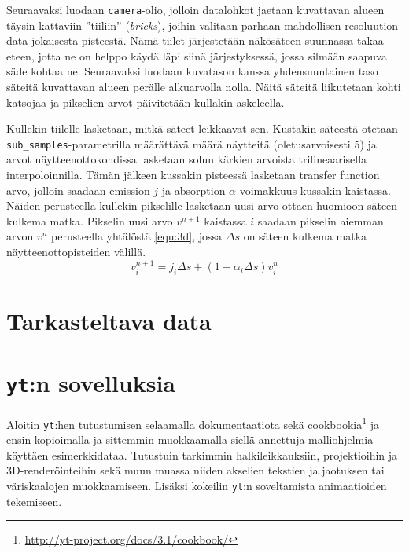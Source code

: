 \documentclass[12pt,a4paper]{article}
\newcommand{\yt}{\texttt{yt}}
\begin{document}
Seuraavaksi luodaan \texttt{camera}-olio, jolloin datalohkot jaetaan kuvattavan alueen täysin kattaviin ''tiiliin'' (\textit{bricks}), joihin valitaan parhaan mahdollisen resoluution data jokaisesta pisteestä. Nämä tiilet järjestetään näkösäteen suunnassa takaa eteen, jotta ne on helppo käydä läpi siinä järjestyksessä, jossa silmään saapuva säde kohtaa ne. Seuraavaksi luodaan kuvatason kanssa yhdensuuntainen taso säteitä kuvattavan alueen perälle alkuarvolla nolla. Näitä säteitä liikutetaan kohti katsojaa ja pikselien arvot päivitetään kullakin askeleella. \cite{volume}

\begin{sloppypar}
Kullekin tiilelle lasketaan, mitkä säteet leikkaavat sen. Kustakin säteestä otetaan \texttt{sub\_samples}-parametrilla määrättävä määrä näytteitä (oletusarvoisesti 5) ja arvot näytteenottokohdissa lasketaan solun kärkien arvoista trilineaarisella interpoloinnilla. Tämän jälkeen kussakin pisteessä lasketaan transfer function arvo, jolloin saadaan emission $j$ ja absorption $\alpha$ voimakkuus kussakin kaistassa. Näiden perusteella kullekin pikselille lasketaan uusi arvo ottaen huomioon säteen kulkema matka. Pikselin uusi arvo $v^{n+1}$ kaistassa $i$ saadaan pikselin aiemman arvon $v^n$ perusteella yhtälöstä \ref{equ:3d}, jossa $\Delta s$ on säteen kulkema matka näytteenottopisteiden välillä.
\begin{equation}\label{equ:3d}
v^{n+1}_{i} =  j_{i}\Delta s + (1 - \alpha_{i}\Delta s )v^{n}_{i}
\end{equation}
\end{sloppypar}


\section{Tarkasteltava data}


\section{\yt :n sovelluksia} %
Aloitin \yt :hen tutustumisen selaamalla dokumentaatiota sekä cookbookia\footnote{\url{http://yt-project.org/docs/3.1/cookbook/}} ja ensin kopioimalla ja sittemmin muokkaamalla siellä annettuja malliohjelmia käyttäen esimerkkidataa. Tutustuin tarkimmin halkileikkauksiin, projektioihin ja 3D-renderöinteihin sekä muun muassa niiden akselien tekstien ja jaotuksen tai väriskaalojen muokkaamiseen. Lisäksi kokeilin \yt :n soveltamista animaatioiden tekemiseen.
\end{document}
